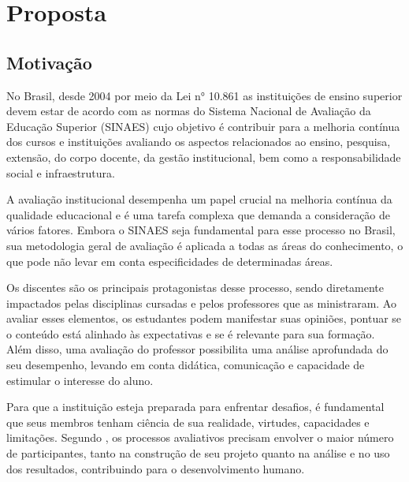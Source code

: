 \chapter{Proposta}\label{chp:PROPOSTA}


\section{Motivação}


No Brasil, desde 2004 por meio da Lei n° 10.861 as instituições de ensino superior devem estar de acordo com as normas do Sistema Nacional de Avaliação da Educação Superior (SINAES)
cujo objetivo é contribuir para a melhoria contínua dos cursos e instituições avaliando 
os aspectos relacionados ao ensino, pesquisa, extensão, do corpo docente, da gestão institucional, bem como a responsabilidade social e infraestrutura.


A avaliação institucional desempenha um papel crucial na melhoria contínua da qualidade educacional
e é uma tarefa complexa que demanda a consideração de vários fatores. Embora o SINAES seja fundamental para esse processo no Brasil, sua metodologia geral de avaliação é aplicada a todas as áreas do conhecimento, o que pode não levar em conta especificidades de determinadas áreas.


Os discentes são os principais protagonistas desse processo, sendo diretamente impactados pelas disciplinas cursadas e pelos professores que as ministraram. Ao avaliar esses elementos, os estudantes podem manifestar suas opiniões, pontuar se o conteúdo está alinhado às expectativas e se é relevante para sua formação. Além disso, uma avaliação do professor possibilita uma análise aprofundada do seu desempenho, levando em conta didática, comunicação e capacidade de estimular o interesse do aluno.



Para que a instituição esteja preparada para enfrentar desafios, é fundamental que seus membros tenham ciência de sua realidade, virtudes, capacidades e limitações.
Segundo , os processos avaliativos precisam envolver o maior número de participantes, tanto na construção de seu projeto quanto na análise e no uso dos resultados, contribuindo para o desenvolvimento humano.

